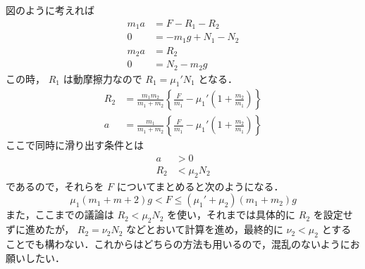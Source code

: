 \documentclass[
  b4paperpaper,
  xelatex,ja=standard]{bxjsbook}
\begin{document}
図のように考えれば \begin{align*}
m_1a&=F-R_1-R_2\\
0&=-m_1g+N_1-N_2\\
m_2a&=R_2\\
0&=N_2-m_2g
\end{align*} この時， \(R_1\) は動摩擦力なので \(R_1=\mu _1' N_1\)
となる． \begin{align*}
R_2&=\frac{m_1m_2}{m_1+m_2}\left\{\frac{F}{m_1}-\mu_1'\left(1+\frac{m_2}{m_1}\right)\right\} \\
a&=\frac{m_1}{m_1+m_2}\left\{\frac{F}{m_1}-\mu_1'\left(1+\frac{m_2}{m_1}\right)\right\}
\end{align*} ここで同時に滑り出す条件とは \begin{align*}
a&>0\\
R_2&<\mu_2N_2
\end{align*} であるので，それらを \(F\)
についてまとめると次のようになる．
\[\mu_1(m_1+m+2)g<F \leq (\mu_1'+\mu_2)(m_1+m_2)g\]
また，ここまでの議論は \(R_2<\mu_2N_2\) を使い，それまでは具体的に
\(R_2\) を設定せずに進めたが， \(R_2=\nu_2 N_2\)
などとおいて計算を進め，最終的に \(\nu_2<\mu_2\)
とすることでも構わない．これからはどちらの方法も用いるので，混乱のないようにお願いしたい．
\end{document}
